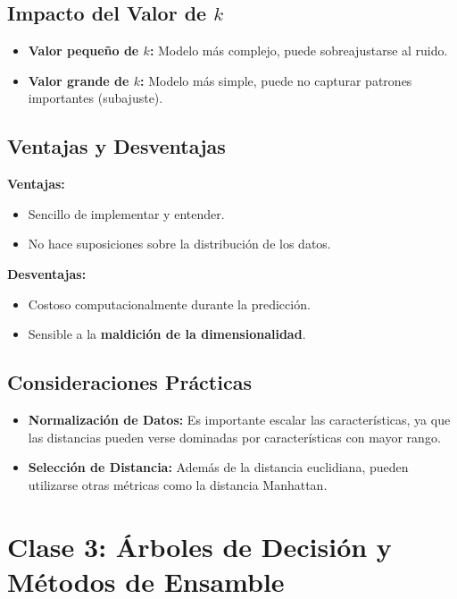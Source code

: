 \documentclass[a4paper, 11pt]{article}
\begin{document}
\subsection{Impacto del Valor de $k$}

\begin{itemize}
    \item \textbf{Valor pequeño de $k$:} Modelo más complejo, puede sobreajustarse al ruido.
    \item \textbf{Valor grande de $k$:} Modelo más simple, puede no capturar patrones importantes (subajuste).
\end{itemize}

\subsection{Ventajas y Desventajas}

\textbf{Ventajas:}
\begin{itemize}
    \item Sencillo de implementar y entender.
    \item No hace suposiciones sobre la distribución de los datos.
\end{itemize}

\textbf{Desventajas:}
\begin{itemize}
    \item Costoso computacionalmente durante la predicción.
    \item Sensible a la \textbf{maldición de la dimensionalidad}.
\end{itemize}

\subsection{Consideraciones Prácticas}

\begin{itemize}
    \item \textbf{Normalización de Datos:} Es importante escalar las características, ya que las distancias pueden verse dominadas por características con mayor rango.
    \item \textbf{Selección de Distancia:} Además de la distancia euclidiana, pueden utilizarse otras métricas como la distancia Manhattan.
\end{itemize}


\newpage
\section{Clase 3: Árboles de Decisión y Métodos de Ensamble}
\end{document}
